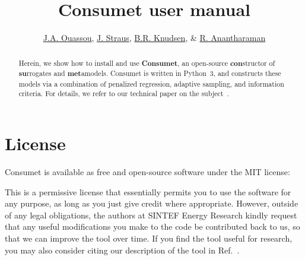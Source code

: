 \documentclass[a4paper,bibliography=numbered]{scrartcl}
\newcommand{\lstfile}[2]{}
\begin{document}
\title{Consumet user manual}
\author{\href{mailto:jabir.ouassou@sintef.no}{J.A. Ouassou},
        \href{mailto:julian.straus@sintef.no}{J. Straus},
        \href{mailto:brage.knudsen@sintef.no}{B.R. Knudsen}, 
	 \& \href{mailto:rahul.anantharaman@sintef.no}{R. Anantharaman}}
\maketitle
\begin{abstract}
	\noindent
	Herein, we show how to install and use \textbf{Consumet}, an open-source \textbf{con}structor of \textbf{su}rrogates and \textbf{met}amodels.
	Consumet is written in Python~3, and constructs these models via a combination of penalized regression, adaptive sampling, and information criteria.
	For details, we refer to our technical paper on the subject~\cite{TechPaper}.
\end{abstract}
\tableofcontents



\newpage
\section{License}
Consumet is available as free and open-source software under the MIT license:
\lstfile{../LICENSE.md}{firstline=4}
This is a permissive license that essentially permits you to use the software for any purpose, as long as you just give credit where appropriate.
However, outside of any legal obligations, the authors at SINTEF Energy Research kindly request that any useful modifications you make to the code be contributed back to us, so that we can improve the tool over time.
If you find the tool useful for research, you may also consider citing our description of the tool in Ref.~\cite{TechPaper}.
\end{document}
